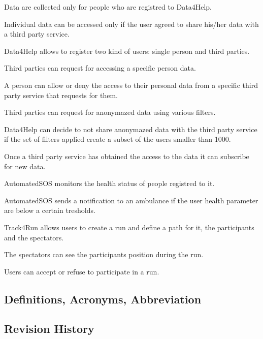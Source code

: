 \documentclass[a4paper]{article}
\begin{document}
\begin{enumerate}[label={[G.\arabic*]}]
	
	
	\item Data are collected only for people who are registred to Data4Help.
	\item Individual data can be accessed only if the user agreed to share his/her data with a third party service.
	\item Data4Help allows to register two kind of users: single person and third parties.
	\item Third parties can request for accessing a specific person data.
	\item A person can allow or deny the access to their personal data from a specific third party service that requests for them.
	\item Third parties can request for anonymazed data using various filters.
	\item Data4Help can decide to not share anonymazed data with the third party service if the set of filters applied create a subset of the users smaller than 1000.
	\item Once a third party service has obtained the access to the data it can subscribe for new data.
	
	\item AutomatedSOS monitors the health status of people registred to it.
	\item AutomatedSOS sends a notification to an ambulance if the user health parameter are below a certain tresholds. 
	
	\item Track4Run allows users to create a run and define a path for it, the participants and the spectators.
	\item The spectators can see the participants position during the run.
	\item Users can accept or refuse to participate in a run.
	
\end{enumerate}

\subsection{Definitions, Acronyms, Abbreviation}


\subsection{Revision History}
\end{document}
